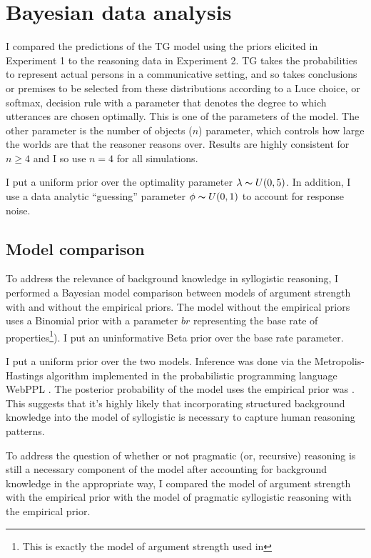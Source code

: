 \documentclass{article} %
\begin{document}
\section{Bayesian data analysis}

I compared the predictions of the TG model using the priors elicited in Experiment 1 to the reasoning data in Experiment 2. TG takes the probabilities to represent actual persons in a communicative setting, and so takes conclusions or premises to be selected from these distributions according to a Luce choice, or softmax, decision rule with a parameter that denotes the degree to which utterances are chosen optimally\cite{Luce1959}. This is one of the parameters of the model. The other parameter is the number of objects ($n$) parameter, which controls how large the worlds are that the reasoner reasons over. Results are highly consistent for $n \geq 4$ and I so use $n=4$ for all simulations.  

I put a uniform prior over the optimality parameter $\lambda \thicksim U(0,5)$. In addition, I use a data analytic ``guessing'' parameter $\phi \thicksim U(0,1)$ to account for response noise.

\subsection{Model comparison}

To address the relevance of background knowledge in syllogistic reasoning, I performed a Bayesian model comparison between models of argument strength with and without the empirical priors. The model without the empirical priors uses a Binomial prior with a parameter $br$ representing the base rate of properties\footnote{This is exactly the model of argument strength used in }). I put an uninformative Beta prior over the base rate parameter.

I put a uniform prior over the two models. Inference was done via the Metropolis-Hastings algorithm implemented in the probabilistic programming language WebPPL \cite{dippl}. The posterior probability of the model uses the empirical prior was . This suggests that it's highly likely that incorporating structured background knowledge into the model of syllogistic is necessary to capture human reasoning patterns.

To address the question of whether or not pragmatic (or, recursive) reasoning is still a necessary component of the model after accounting for background knowledge in the appropriate way, I compared the model of argument strength with the empirical prior with the model of pragmatic syllogistic reasoning with the empirical prior. 
\end{document}

